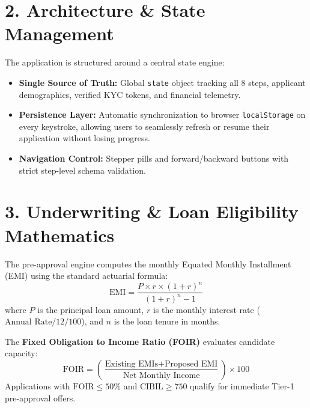 \documentclass[11pt,a4paper]{article}
\begin{document}
\section{2. Architecture \& State Management}
The application is structured around a central state engine:
\begin{itemize}[leftmargin=1.5em, itemsep=2pt]
    \item \textbf{Single Source of Truth:} Global \texttt{state} object tracking all 8 steps, applicant demographics, verified KYC tokens, and financial telemetry.
    \item \textbf{Persistence Layer:} Automatic synchronization to browser \texttt{localStorage} on every keystroke, allowing users to seamlessly refresh or resume their application without losing progress.
    \item \textbf{Navigation Control:} Stepper pills and forward/backward buttons with strict step-level schema validation.
\end{itemize}

\section{3. Underwriting \& Loan Eligibility Mathematics}
The pre-approval engine computes the monthly Equated Monthly Installment (EMI) using the standard actuarial formula:
\[
\text{EMI} = \frac{P \times r \times (1 + r)^n}{(1 + r)^n - 1}
\]
where $P$ is the principal loan amount, $r$ is the monthly interest rate ($\text{Annual Rate} / 12 / 100$), and $n$ is the loan tenure in months.

The \textbf{Fixed Obligation to Income Ratio (FOIR)} evaluates candidate capacity:
\[
\text{FOIR} = \left(\frac{\text{Existing EMIs} + \text{Proposed EMI}}{\text{Net Monthly Income}}\right) \times 100
\]
Applications with $\text{FOIR} \le 50\%$ and $\text{CIBIL} \ge 750$ qualify for immediate Tier-1 pre-approval offers.
\end{document}
